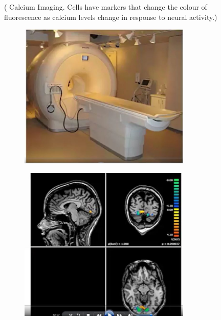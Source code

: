 \documentclass[]{article}
\begin{document}
\begin{figure}[H]
	\caption[Recording from the Brain]{Recording from the Brain. () \& () fMRI: resolution $1\;mm^3$; response is averaged over many neurons, and is slow. () EEG: response is averaged over many neurons; EEG is faster than fMRI, but noisy. () \& () Electrode Arrays: good if we have access to tissue directly} \label{fig:recording} ( Calcium Imaging. Cells have markers that change the colour of fluorescence as calcium levels change in response to neural activity.)
	\begin{subfigure}[b]{0.3\textwidth}
		\caption{}\label{fig:rb1}
		\includegraphics[width=0.9\textwidth]{fMRI}
	\end{subfigure}
	\begin{subfigure}[b]{0.3\textwidth}
		\caption{}\label{fig:rb2}
		\includegraphics[width=0.9\textwidth]{fMRI2}

\end{subfigure}
\end{figure}
\end{document}
